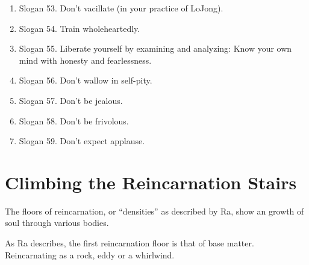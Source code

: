 \begin{enumerate}
\begin{enumerate}
        \item Slogan 53. Don't vacillate (in your practice of LoJong).
        \item Slogan 54. Train wholeheartedly.
        \item Slogan 55. Liberate yourself by examining and analyzing: Know your own mind with honesty and fearlessness.
        \item Slogan 56. Don't wallow in self-pity.
        \item Slogan 57. Don't be jealous.
        \item Slogan 58. Don't be frivolous.
        \item Slogan 59. Don't expect applause.
      \end{enumerate}
\end{enumerate}



\chapter{Climbing the Reincarnation Stairs}
\label{chapter:climbing}
The floors of reincarnation, or ``densities'' as described by Ra, show an growth
of soul through various bodies. 


As Ra describes, the first reincarnation floor is that of base matter.
Reincarnating as a rock, eddy or a whirlwind. 

